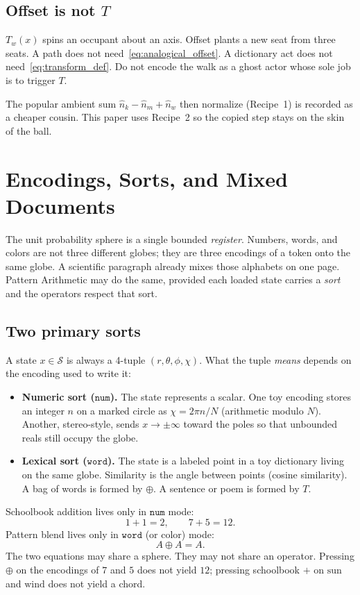 \documentclass[12pt, a4paper]{article}
\begin{document}
\subsection{Offset is not $T$}
\label{subsec:offset_not_T}
$T_w(x)$ spins an occupant about an axis. Offset plants a new seat
from three seats. A path does not need~\eqref{eq:analogical_offset}.
A dictionary act does not need~\eqref{eq:transform_def}. Do not
encode the walk as a ghost actor whose sole job is to trigger $T$.

The popular ambient sum $\hat n_k-\hat n_m+\hat n_w$ then
normalize (Recipe~1) is recorded as a cheaper cousin. This paper
uses Recipe~2 so the copied step stays on the skin of the ball.

\section{Encodings, Sorts, and Mixed Documents}
\label{sec:encodings_sorts}

The unit probability sphere is a single bounded \emph{register}.
Numbers, words, and colors are not three different globes; they are
three encodings of a token onto the same globe. A scientific paragraph
already mixes those alphabets on one page. Pattern Arithmetic may do
the same, provided each loaded state carries a \emph{sort} and the
operators respect that sort.

\subsection{Two primary sorts}
\label{subsec:sorts}
A state $x\in\mathcal{S}$ is always a 4-tuple
$(r,\theta,\phi,\chi)$. What the tuple \emph{means} depends on the
encoding used to write it:
\begin{itemize}
    \item \textbf{Numeric sort ($\mathtt{num}$).}
          The state represents a scalar. One toy encoding stores an
          integer $n$ on a marked circle as
          $\chi = 2\pi n/N$ (arithmetic modulo $N$).
          Another, stereo-style, sends $x\to\pm\infty$ toward the
          poles so that unbounded reals still occupy the globe.
    \item \textbf{Lexical sort ($\mathtt{word}$).}
          The state is a labeled point in a toy dictionary living on
          the same globe. Similarity is the angle between points
          (cosine similarity). A bag of words is formed by $\oplus$.
          A sentence or poem is formed by $T$.
\end{itemize}
Schoolbook addition lives only in $\mathtt{num}$ mode:
\begin{equation}
    1 + 1 = 2, \qquad 7 + 5 = 12.
\end{equation}
Pattern blend lives only in $\mathtt{word}$ (or color) mode:
\begin{equation}
    A \oplus A = A.
\end{equation}
The two equations may share a sphere. They may not share an operator.
Pressing $\oplus$ on the encodings of $7$ and $5$ does not yield $12$;
pressing schoolbook $+$ on $\mathrm{sun}$ and $\mathrm{wind}$ does not
yield a chord.
\end{document}

